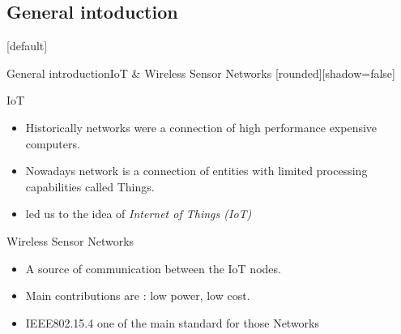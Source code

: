 \documentclass{beamer}
\makeatletter
\newenvironment{withoutheadline}{
        \setbeamertemplate{headline}[default]
        \def\beamer@entrycode{\vspace*{-\headheight}}
    }{}
\makeatother
\begin{document}
\subsection{General intoduction}
\begin{withoutheadline}
\begin{frame}{General introduction}{IoT \& Wireless Sensor Networks}
[rounded][shadow=false]
 \begin{block}{IoT}
    \begin{itemize}
    \item Historically networks were a connection of high performance expensive computers.
    \item<2-> Nowadays network is a connection of entities with limited processing capabilities called Things. 
    \item<3->  led us to the idea of {\em Internet of Things (IoT)}
    \end{itemize}
  \end{block} 
  
  {
\begin{block}{Wireless Sensor Networks}
    \begin{itemize}
    \item<4-> A source of communication between the IoT nodes.
    \item<5-> Main contributions are : low power, low cost.
    \item<6->  IEEE802.15.4 one of the main standard for those Networks
    \end{itemize}
    \end{block}}

  
  
\end{frame}
\end{withoutheadline}
\end{document}
